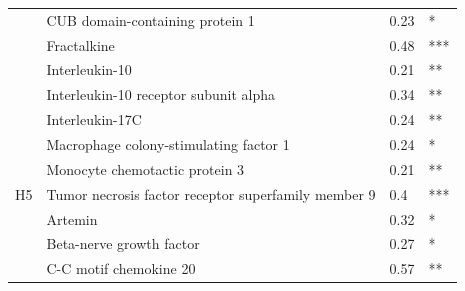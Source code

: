 \begin{table}[ht]
{\begin{tabular}{clll}
                                           & CUB domain-containing protein 1                                                       & 0.23                               & *                                       \\
                                           & Fractalkine                                                                           & 0.48                               & ***                                     \\
                                           & \cellcolor[HTML]{EFEFEF}Interleukin-10                                                & \cellcolor[HTML]{EFEFEF}0.21       & \cellcolor[HTML]{EFEFEF}**              \\
                                           & \cellcolor[HTML]{EFEFEF}Interleukin-10 receptor subunit alpha                         & \cellcolor[HTML]{EFEFEF}0.34       & \cellcolor[HTML]{EFEFEF}**              \\
                                           & \cellcolor[HTML]{EFEFEF}Interleukin-17C                                               & \cellcolor[HTML]{EFEFEF}0.24       & \cellcolor[HTML]{EFEFEF}**              \\
                                           & \cellcolor[HTML]{EFEFEF}Macrophage colony-stimulating factor 1                        & \cellcolor[HTML]{EFEFEF}0.24       & \cellcolor[HTML]{EFEFEF}*               \\
                                           & Monocyte chemotactic protein 3                                                        & 0.21                               & **                                      \\
\multirow{-13}{*}{H5}                      & Tumor necrosis factor receptor superfamily member 9                                   & 0.4                                & ***                                     \\ \hline
                                           & Artemin                                                                               & 0.32                               & *                                       \\
                                           & Beta-nerve growth factor                                                              & 0.27                               & *                                       \\
                                           & \cellcolor[HTML]{EFEFEF}C-C motif chemokine 20                                        & \cellcolor[HTML]{EFEFEF}0.57       & \cellcolor[HTML]{EFEFEF}**              \\

\end{tabular}}
\end{table}
